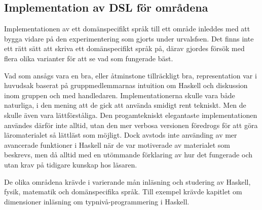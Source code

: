 \begin{draft}

\subsection{Implementation av DSL för områdena}

Implementationen av ett domänspecifikt språk till ett område inleddes med att bygga vidare på den experimentering som gjorts under urvalsfsen. Det finns inte ett rätt sätt att skriva ett domänspecifikt språk på, därav gjordes försök med flera olika varianter för att se vad som fungerade bäst.

Vad som ansågs vara en bra, eller åtminstone tillräckligt bra, representation var i huvudsak baserat på gruppmedlemmarnas intuition om Haskell och diskussion inom gruppen och med handledaren. Implementationerna skulle vara både naturliga, i den mening att de gick att använda smidigt rent tekniskt. Men de skulle även vara lättförståliga. Den progamtekniskt elegantaste implementationen användes därför inte alltid, utan den mer verbosa versionen föredrogs för att göra läromaterialet så lättläst som möjligt. Dock avstods inte använding av mer avancerade funktioner i Haskell när de var motiverade av materialet som beskrevs, men då alltid med en utömmande förklaring av hur det fungerade och utan krav på tidigare kunskap hos läsaren.

De olika områdena krävde i varierande mån inläsning och studering av Haskell,
fysik, matematik och domänspecifika språk. Till exempel krävde kapitlet om
dimensioner inläsning om typnivå-programmering i Haskell. 

\end{draft}


